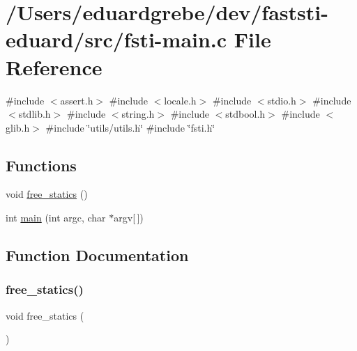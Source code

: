 \hypertarget{fsti-main_8c}{}\section{/\+Users/eduardgrebe/dev/faststi-\/eduard/src/fsti-\/main.c File Reference}
\label{fsti-main_8c}
{\ttfamily \#include $<$assert.\+h$>$}\newline
{\ttfamily \#include $<$locale.\+h$>$}\newline
{\ttfamily \#include $<$stdio.\+h$>$}\newline
{\ttfamily \#include $<$stdlib.\+h$>$}\newline
{\ttfamily \#include $<$string.\+h$>$}\newline
{\ttfamily \#include $<$stdbool.\+h$>$}\newline
{\ttfamily \#include $<$glib.\+h$>$}\newline
{\ttfamily \#include \char`\"{}utils/utils.\+h\char`\"{}}\newline
{\ttfamily \#include \char`\"{}fsti.\+h\char`\"{}}\newline
\subsection*{Functions}
\begin{DoxyCompactItemize}
\item 
void \mbox{\hyperlink{fsti-main_8c_a8efc163df9c5301b50fcffeb39782b62}{free\+\_\+statics}} ()
\item 
int \mbox{\hyperlink{fsti-main_8c_a0ddf1224851353fc92bfbff6f499fa97}{main}} (int argc, char $\ast$argv\mbox{[}$\,$\mbox{]})
\end{DoxyCompactItemize}


\subsection{Function Documentation}
\mbox{\label{fsti-main_8c_a8efc163df9c5301b50fcffeb39782b62}} 
\subsubsection{\texorpdfstring{free\+\_\+statics()}{free\_statics()}}
{\footnotesize\ttfamily void free\+\_\+statics (\begin{DoxyParamCaption}{ }\end{DoxyParamCaption})}

